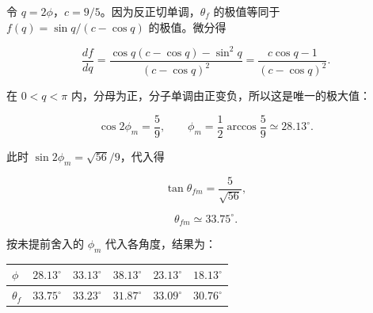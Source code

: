 \documentclass[12pt,a4paper,fontset=fandol]{ctexart}
\begin{document}
令 \(q=2\phi\)，\(c=9/5\)。因为反正切单调，\(\theta_f\) 的极值等同于
\(f(q)=\sin q/(c-\cos q)\) 的极值。微分得

\[\frac{df}{dq}
=\frac{\cos q(c-\cos q)-\sin^2q}{(c-\cos q)^2}
=\frac{c\cos q-1}{(c-\cos q)^2}.\]

在 \(0<q<\pi\) 内，分母为正，分子单调由正变负，所以这是唯一的极大值：

\[\boxed{\cos2\phi_m=\frac59,
\qquad\phi_m=\frac12\arccos\frac59\simeq28.13^\circ.}\]

此时 \(\sin2\phi_m=\sqrt{56}/9\)，代入得

\[\tan\theta_{fm}=\frac5{\sqrt{56}},\]

\[\boxed{\theta_{fm}\simeq33.75^\circ.}\]

按未提前舍入的 \(\phi_m\) 代入各角度，结果为：

{\def\LTcaptype{table} %
\begin{longtable}[]{@{}
  >{\raggedright\arraybackslash}p{}
  >{\raggedright\arraybackslash}p{}
  >{\raggedright\arraybackslash}p{}
  >{\raggedright\arraybackslash}p{}
  >{\raggedright\arraybackslash}p{}
  >{\raggedright\arraybackslash}p{}@{}}
\toprule\noalign{}
\begin{minipage}[b]{\linewidth}\raggedright
\(\phi\)
\end{minipage} & \begin{minipage}[b]{\linewidth}\raggedright
\(28.13^\circ\)
\end{minipage} & \begin{minipage}[b]{\linewidth}\raggedright
\(33.13^\circ\)
\end{minipage} & \begin{minipage}[b]{\linewidth}\raggedright
\(38.13^\circ\)
\end{minipage} & \begin{minipage}[b]{\linewidth}\raggedright
\(23.13^\circ\)
\end{minipage} & \begin{minipage}[b]{\linewidth}\raggedright
\(18.13^\circ\)
\end{minipage} \\
\midrule\noalign{}
\endhead
\bottomrule\noalign{}
\endlastfoot
\(\theta_f\) & \(33.75^\circ\) & \(33.23^\circ\) & \(31.87^\circ\) &
\(33.09^\circ\) & \(30.76^\circ\) \\
\end{longtable}
}
\end{document}
